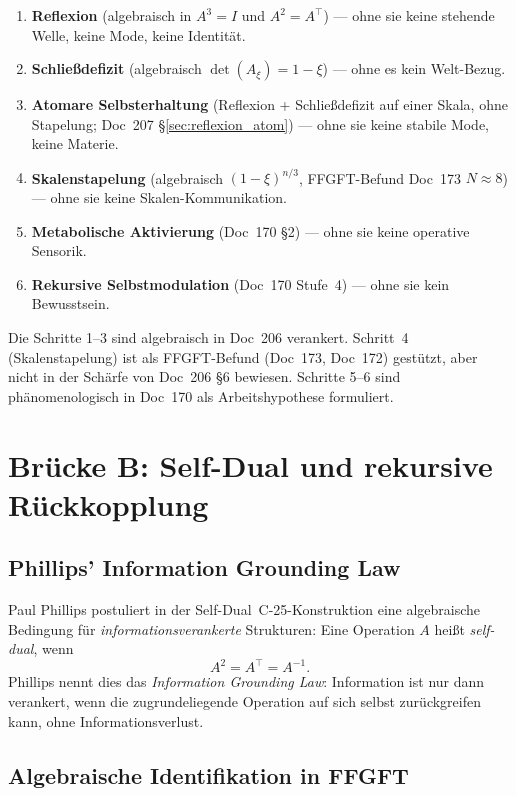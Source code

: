 \begin{enumerate}
\item \textbf{Reflexion} (algebraisch in $A^3 = I$ und $A^2 = A^\top$) --- ohne sie keine stehende Welle, keine Mode, keine Identität.
\item \textbf{Schließdefizit} (algebraisch $\det(A_\xi) = 1-\xi$) --- ohne es kein Welt-Bezug.
\item \textbf{Atomare Selbsterhaltung} (Reflexion + Schließdefizit auf einer Skala, ohne Stapelung; Doc~207 \S\ref{sec:reflexion_atom}) --- ohne sie keine stabile Mode, keine Materie.
\item \textbf{Skalenstapelung} (algebraisch $(1-\xi)^{n/3}$, FFGFT-Befund Doc~173 $N \approx 8$) --- ohne sie keine Skalen-Kommunikation.
\item \textbf{Metabolische Aktivierung} (Doc~170 \S2) --- ohne sie keine operative Sensorik.
\item \textbf{Rekursive Selbstmodulation} (Doc~170 Stufe~4) --- ohne sie kein Bewusstsein.
\end{enumerate}

Die Schritte 1--3 sind algebraisch in Doc~206 verankert. Schritt~4 (Skalenstapelung) ist als FFGFT-Befund (Doc~173, Doc~172) gestützt, aber nicht in der Schärfe von Doc~206 \S6 bewiesen. Schritte 5--6 sind phänomenologisch in Doc~170 als Arbeitshypothese formuliert.

\section{Brücke B: Self-Dual und rekursive Rückkopplung}\label{sec:brueckeB}

\subsection{Phillips' Information Grounding Law}

Paul Phillips postuliert in der Self-Dual~C-25-Konstruktion eine algebraische Bedingung für \emph{informationsverankerte} Strukturen: Eine Operation $A$ heißt \emph{self-dual}, wenn
\begin{equation}
A^2 = A^\top = A^{-1}.
\end{equation}
Phillips nennt dies das \emph{Information Grounding Law}: Information ist nur dann verankert, wenn die zugrundeliegende Operation auf sich selbst zurückgreifen kann, ohne Informationsverlust.

\subsection{Algebraische Identifikation in FFGFT}

